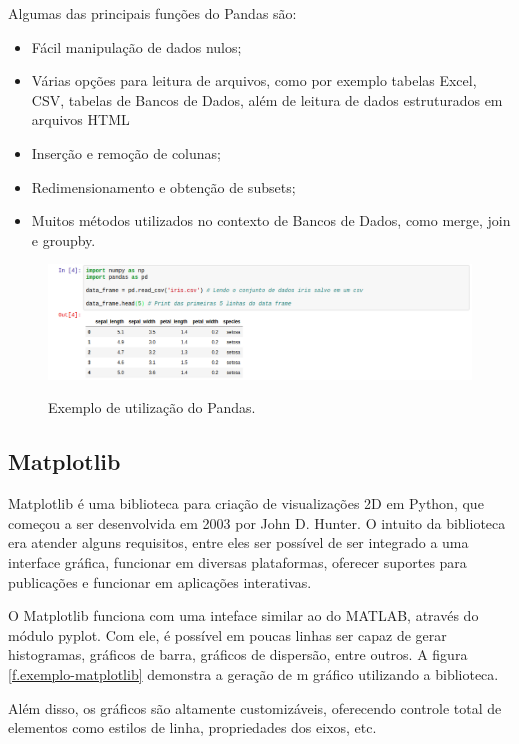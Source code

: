 Algumas das principais funções do Pandas são:

\begin{itemize}
    \item Fácil manipulação de dados nulos;
    \item Várias opções para leitura de arquivos, como por exemplo tabelas Excel, CSV, tabelas de Bancos de Dados, além de leitura de dados estruturados em arquivos HTML
    \item Inserção e remoção de colunas;
    \item Redimensionamento e obtenção de subsets;
    \item Muitos métodos utilizados no contexto de Bancos de Dados, como merge, join e groupby.
\end{itemize}

\begin{figure}[h]
\caption{\small Exemplo de utilização do Pandas.}
\centering
\includegraphics[scale=0.40]{figs/exemplo-pandas.png}
\label{f.exemplo-pandas}
\end{figure}

\subsection{Matplotlib}
\label{ss.matplotlib}

Matplotlib é uma biblioteca para criação de visualizações 2D em Python, que começou a ser desenvolvida em 2003 por John D. Hunter. O intuito da biblioteca era atender alguns requisitos, entre eles ser possível de ser integrado a uma interface gráfica, funcionar em diversas plataformas, oferecer suportes para publicações e funcionar em aplicações interativas. \cite{matplotlib}

O Matplotlib funciona com uma inteface similar ao do MATLAB, através do módulo pyplot. Com ele, é possível em poucas linhas ser capaz de gerar histogramas, gráficos de barra, gráficos de dispersão, entre outros.  A figura \ref{f.exemplo-matplotlib} demonstra a geração de m gráfico utilizando a biblioteca.

Além disso, os gráficos são altamente customizáveis, oferecendo controle total de elementos como estilos de linha, propriedades dos eixos, etc.

